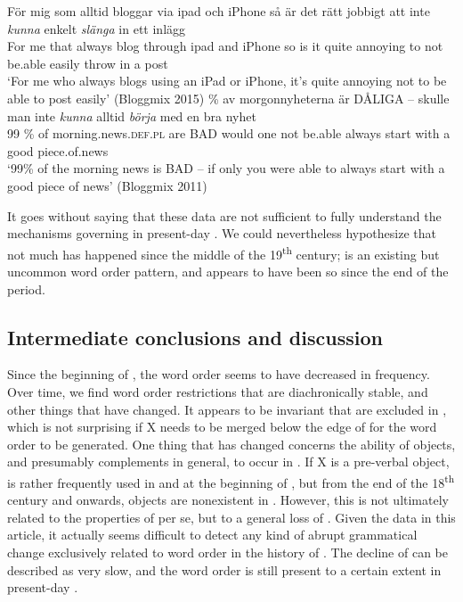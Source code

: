 \documentclass[output=paper, colorlinks, citecolor=brown]{langscibook}
\begin{document}
\ea {}\label{ex:sangfelt:27}
\ea\label{ex:sangfelt:27a}
\gll För mig som alltid bloggar via ipad och iPhone så är det rätt jobbigt att inte \textit{kunna} {enkelt} \textit{slänga} in ett inlägg\\
 For me that always blog through ipad and iPhone so is it quite annoying to not be.able easily throw in a post\\
\glt ‘For me who always blogs using an iPad or iPhone, it’s quite annoying not to be able to post easily’ (Bloggmix 2015)
\ex \label{ex:sangfelt:27b} \% av morgonnyheterna är DÅLIGA – skulle man inte \textit{kunna} {alltid} \textit{börja} med en bra nyhet \\
                                99 \% of morning.news.\textsc{def.pl} are BAD {} would one not be.able always start with a good piece.of.news \\
\glt ‘99\% of the morning news is BAD – if only you were able to always start with a good piece of news’ (Bloggmix 2011)\\
\z 
\z 

It goes without saying that these data are not sufficient to fully understand the mechanisms governing  in present-day . We could nevertheless hypothesize that not much has happened since the middle of the 19\textsuperscript{th} century;  is an existing but uncommon word order pattern, and appears to have been so since the end of the  period.

\subsection{Intermediate conclusions and discussion}\label{sec:sangfelt:4.4}
Since the beginning of , the  word order seems to have decreased in frequency. Over time, we find word order restrictions that are diachronically stable, and other things that have changed. It appears to be invariant that  are excluded in , which is not surprising if X needs to be merged below the edge of  for the word order to be generated. One thing that has changed concerns the ability of objects, and presumably complements in general, to occur in . If X is a pre-verbal object,  is rather frequently used in  and at the beginning of , but from the end of the 18\textsuperscript{th} century and onwards, objects are nonexistent in . However, this is not ultimately related to the properties of  per se, but to a general loss of . Given the data in this article, it actually seems difficult to detect any kind of abrupt grammatical change exclusively related to  word order in the history of . The decline of  can be described as very slow, and the word order is still present to a certain extent in present-day .
\end{document}

